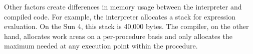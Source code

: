 Other factors create differences in memory usage between the
interpreter and compiled code. For example, the interpreter allocates
a stack for expression evaluation. On the Sun 4, this stack is 40,000
bytes. The compiler, on the other hand, allocates work areas on a
per-procedure basis and only allocates the maximum needed at any
execution point within the procedure.

